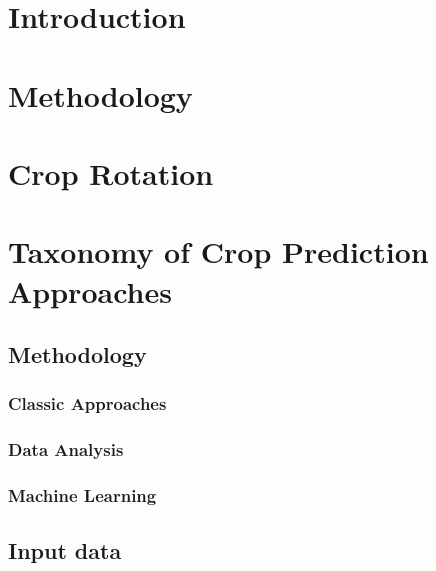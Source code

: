 \documentclass{Academic}
\begin{document}
\myabstract{}
\renewcommand{\myTitle}{A Survey of State of the Art Crop Rotation Prediction Approaches}
\renewcommand{\MyAuthor}{Leon Knorr}
\renewcommand{\MyDepartment}{Mannheim Master of Datascience}
\renewcommand{\ID}{1902854}
\renewcommand{\Keywords}{Agriculture, AI, Crop Rotation}
\maketitle
\onehalfspacing

\section{Introduction}

\section{Methodology}

\section{Crop Rotation}

\section{Taxonomy of Crop Prediction Approaches}

\subsection{Methodology}

\subsubsection{Classic Approaches}

\subsubsection{Data Analysis}

\subsubsection{Machine Learning}

\subsection{Input data}
\end{document}
